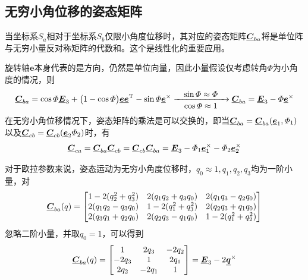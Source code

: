 \subsection{无穷小角位移的姿态矩阵}
当坐标系$S_a$相对于坐标系$S_b$仅限小角度位移时，其对应的姿态矩阵$\underline{\bm{C}}_{ba}$将是单位阵与无穷小量反对称矩阵的代数和。这个是线性化的重要应用。


旋转轴$\bm{e}$本身代表的是方向，仍然是单位向量，因此小量假设仅考虑转角$\varPhi$为小角度的情况，则
\begin{equation}
	\underline{\bm{C}}_{ba} = \cos \varPhi \underline{\bm{E}}_3 + \big( 1 - \cos \varPhi \big) \underline{\bm{e}} \underline{\bm{e}}^{\text{T}} - \sin \varPhi \underline{\bm{e}}^\times \xrightarrow[ \textstyle \quad \cos \varPhi \approx 1 \quad ]{ \textstyle \quad \sin \varPhi \approx \varPhi \quad }
	\underline{\bm{C}}_{ba} = \underline{\bm{E}}_3 - \varPhi \underline{\bm{e}}^\times 
\end{equation}
在无穷小角位移情况下，姿态矩阵的乘法是可以交换的，即当$\underline{\bm{C}}_{ba} = \underline{\bm{C}}_{ba}(\underline{\bm{e}}_1, \varPhi_1)$以及$\underline{\bm{C}}_{cb} = \underline{\bm{C}}_{cb} (\underline{\bm{e}}_2 \varPhi_2)$时，有
\begin{equation}
	\underline{\bm{C}}_{ca} = \underline{\bm{C}}_{ba} \underline{\bm{C}}_{cb} = \underline{\bm{C}}_{cb} \underline{\bm{C}}_{ba} = \underline{\bm{E}}_3 - \varPhi_1 \underline{\bm{e}}_1^\times - \varPhi_2 \underline{\bm{e}}_2^\times 
\end{equation}


\sssection[用欧拉参数表示的姿态矩阵]

对于欧拉参数来说，姿态运动为无穷小角度位移时，$q_0 \approx 1, q_1, q_2, q_3$均为一阶小量，对
\begin{equation*}
	\underline{\bm{C}}_{ba}(q) = 
	\begin{bmatrix}
		1 - 2(q_2^2 + q_3^2) & 2(q_1q_2 + q_3q_0) & 2(q_1q_3 - q_2q_0)\\
		2(q_1q_2 - q_3q_0)  & 1 - 2(q_1^2 + q_3^2) & 2(q_2q_3 + q_1q_0) \\
		2(q_3q_1 + q_2q_0)& 2(q_2q_3 - q_1q_0) & 1 - 2(q_1^2 + q_2^2)
	\end{bmatrix}
\end{equation*}
忽略二阶小量，并取$q_0 = 1$，可以得到
\begin{equation}
	\underline{\bm{C}}_{ba}(q) = 
	\begin{bmatrix}
		1 & 2q_3 & -2q_2 \\
		-2q_3 & 1 & 2q_1 \\
		2q_2 & -2q_1 & 1
	\end{bmatrix}
	= \underline{\bm{E}}_3 - 2 \underline{\bm{q}}^\times
\end{equation}

